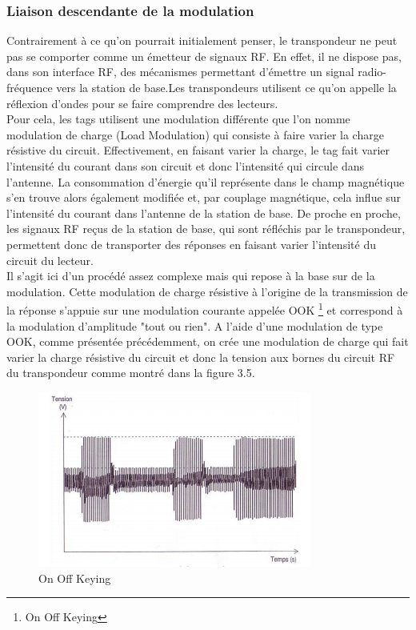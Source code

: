 \documentclass[11pt, a4paper, twoside]{book}
\begin{document}
\subsubsection{Liaison descendante de la modulation}
Contrairement à ce qu'on pourrait initialement penser, le transpondeur ne peut pas se comporter comme un émetteur de signaux RF. En effet, il ne dispose pas, dans son interface RF, des mécanismes permettant d'émettre un signal radio-fréquence vers la station de base.Les transpondeurs utilisent ce qu'on appelle la réflexion d'ondes pour se faire comprendre des lecteurs. \\

Pour cela, les tags utilisent une modulation différente que l'on nomme modulation de charge (Load Modulation) qui consiste à faire varier la charge résistive du circuit. Effectivement, en faisant varier la charge, le tag fait varier l'intensité du courant dans son circuit et donc l'intensité qui circule dans l'antenne. La consommation d'énergie qu'il représente dans le champ magnétique s'en trouve alors également modifiée et, par couplage magnétique, cela influe sur l'intensité du courant dans l'antenne de la station de base. De proche en proche, les signaux RF reçus de la station de base, qui sont réfléchis par le transpondeur, permettent donc de transporter des réponses en faisant varier l'intensité du circuit du lecteur.\\

Il s'agit ici d'un procédé assez complexe mais qui repose à la base sur de la modulation. Cette modulation de charge résistive à l'origine de la transmission de la réponse s'appuie sur une modulation courante appelée OOK \footnote{On Off Keying} et correspond à la modulation d'amplitude "tout ou rien". A l'aide d'une modulation de type OOK, comme présentée précédemment, on crée une modulation de charge qui fait varier la charge résistive du circuit et donc la tension aux bornes du circuit RF du transpondeur comme montré dans la figure 3.5.

\begin{figure}[h!]
\centering
\includegraphics[width=\textwidth]{ook}
\caption{On Off Keying}
\end{figure}
\end{document}
